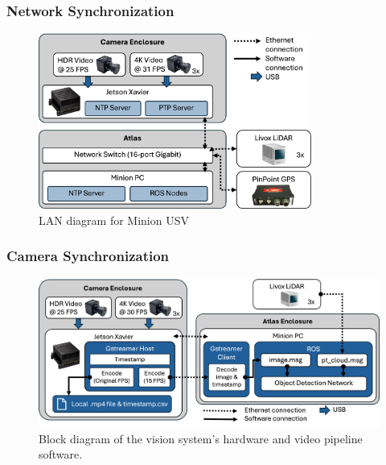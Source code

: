 \documentclass{erauthesis}
\begin{document}
\subsubsection{Network Synchronization} \label{time_sync_lan}


\begin{figure}[htbp]
\centering
\includegraphics[width=0.8\textwidth]{Images/network_diagram2.png}
\caption{LAN diagram for Minion USV}
\label{fig:network_sync}
\end{figure}

\subsubsection{Camera Synchronization} \label{time_sync_cam}

\begin{figure}[htbp]
\centering
\includegraphics[width=5in]{Images/Video_Block_Diagram.png}
\caption{Block diagram of the vision system's hardware and video pipeline software.}
\label{video_pipeline}
\end{figure}



\end{document}
